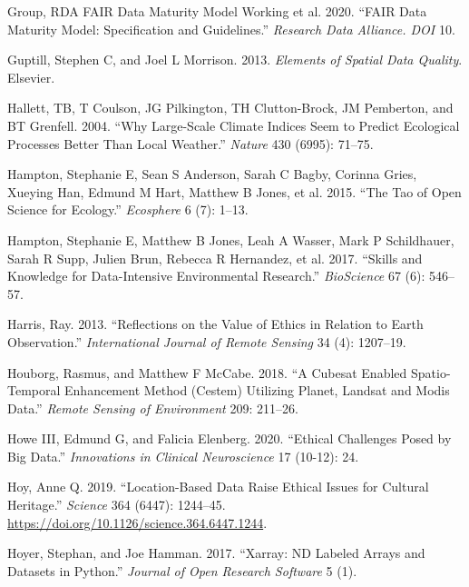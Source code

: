\documentclass[
  12pt,
]{article}
\newlength{\cslhangindent}
\newlength{\cslentryspacingunit} %
\newenvironment{CSLReferences}[2] %
 {%
  \setlength{\parindent}{0pt}
  \ifodd #1
  \let\oldpar\par
  \def\par{\hangindent=\cslhangindent\oldpar}
  \fi
  \setlength{\parskip}{#2\cslentryspacingunit}
 }%
 {}
\begin{document}
\begin{CSLReferences}{1}{0}
\leavevmode{}%
Group, RDA FAIR Data Maturity Model Working et al. 2020. {``FAIR Data
Maturity Model: Specification and Guidelines.''} \emph{Research Data
Alliance. DOI} 10.

\leavevmode{}%
Guptill, Stephen C, and Joel L Morrison. 2013. \emph{Elements of Spatial
Data Quality}. Elsevier.

\leavevmode{}%
Hallett, TB, T Coulson, JG Pilkington, TH Clutton-Brock, JM Pemberton,
and BT Grenfell. 2004. {``Why Large-Scale Climate Indices Seem to
Predict Ecological Processes Better Than Local Weather.''} \emph{Nature}
430 (6995): 71--75.

\leavevmode{}%
Hampton, Stephanie E, Sean S Anderson, Sarah C Bagby, Corinna Gries,
Xueying Han, Edmund M Hart, Matthew B Jones, et al. 2015. {``The Tao of
Open Science for Ecology.''} \emph{Ecosphere} 6 (7): 1--13.

\leavevmode{}%
Hampton, Stephanie E, Matthew B Jones, Leah A Wasser, Mark P
Schildhauer, Sarah R Supp, Julien Brun, Rebecca R Hernandez, et al.
2017. {``Skills and Knowledge for Data-Intensive Environmental
Research.''} \emph{BioScience} 67 (6): 546--57.

\leavevmode{}%
Harris, Ray. 2013. {``Reflections on the Value of Ethics in Relation to
Earth Observation.''} \emph{International Journal of Remote Sensing} 34
(4): 1207--19.

\leavevmode{}%
Houborg, Rasmus, and Matthew F McCabe. 2018. {``A Cubesat Enabled
Spatio-Temporal Enhancement Method (Cestem) Utilizing Planet, Landsat
and Modis Data.''} \emph{Remote Sensing of Environment} 209: 211--26.

\leavevmode{}%
Howe III, Edmund G, and Falicia Elenberg. 2020. {``Ethical Challenges
Posed by Big Data.''} \emph{Innovations in Clinical Neuroscience} 17
(10-12): 24.

\leavevmode{}%
Hoy, Anne Q. 2019. {``Location-Based Data Raise Ethical Issues for
Cultural Heritage.''} \emph{Science} 364 (6447): 1244--45.
\url{https://doi.org/10.1126/science.364.6447.1244}.

\leavevmode{}%
Hoyer, Stephan, and Joe Hamman. 2017. {``Xarray: ND Labeled Arrays and
Datasets in Python.''} \emph{Journal of Open Research Software} 5 (1).


\end{CSLReferences}
\end{document}
